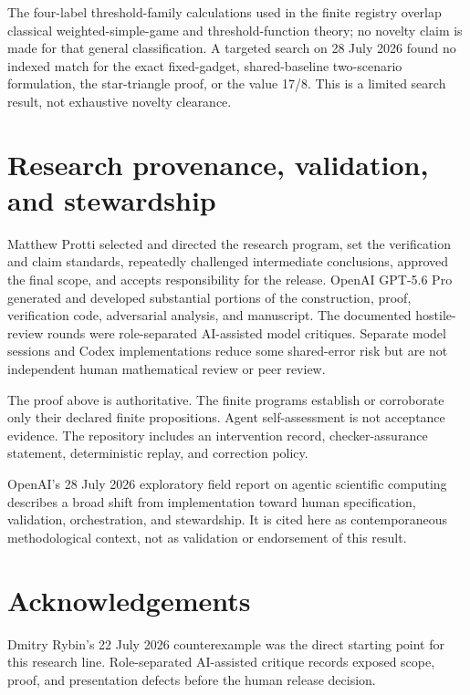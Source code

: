\documentclass[
  11pt,
]{article}
\begin{document}
The four-label threshold-family calculations used in the finite registry
overlap classical weighted-simple-game and threshold-function theory; no
novelty claim is made for that general classification. A targeted search
on 28 July 2026 found no indexed match for the exact fixed-gadget,
shared-baseline two-scenario formulation, the star-triangle proof, or
the value 17/8. This is a limited search result, not exhaustive novelty
clearance.

\section{Research provenance, validation, and
stewardship}\label{research-provenance-validation-and-stewardship}

Matthew Protti selected and directed the research program, set the
verification and claim standards, repeatedly challenged intermediate
conclusions, approved the final scope, and accepts responsibility for
the release. OpenAI GPT-5.6 Pro generated and developed substantial
portions of the construction, proof, verification code, adversarial
analysis, and manuscript. The documented hostile-review rounds were
role-separated AI-assisted model critiques. Separate model sessions and
Codex implementations reduce some shared-error risk but are not
independent human mathematical review or peer review.

The proof above is authoritative. The finite programs establish or
corroborate only their declared finite propositions. Agent
self-assessment is not acceptance evidence. The repository includes an
intervention record, checker-assurance statement, deterministic replay,
and correction policy.

OpenAI's 28 July 2026 exploratory field report on agentic scientific
computing describes a broad shift from implementation toward human
specification, validation, orchestration, and stewardship. It is cited
here as contemporaneous methodological context, not as validation or
endorsement of this result.

\section{Acknowledgements}\label{acknowledgements}

Dmitry Rybin's 22 July 2026 counterexample was the direct starting point
for this research line. Role-separated AI-assisted critique records
exposed scope, proof, and presentation defects before the human release
decision.
\end{document}
